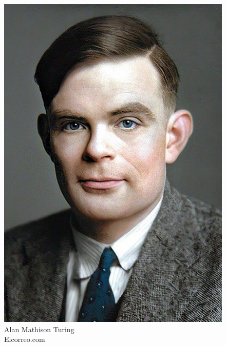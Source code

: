\begin{frame}[t]
{\begin{minipage}[t]{\textwidth}
\begin{minipage}[t]{0.4\textwidth}
\begin{figure}[ht]
				    \includegraphics[width=.6\textwidth]{img/alan-turing-color.png}
				    {\tiny\\Alan Mathison Turing\\\textcopyright Elcorreo.com}
			    \end{figure}
		    \end{minipage}
	    \end{minipage}
    }
\end{frame}
%
